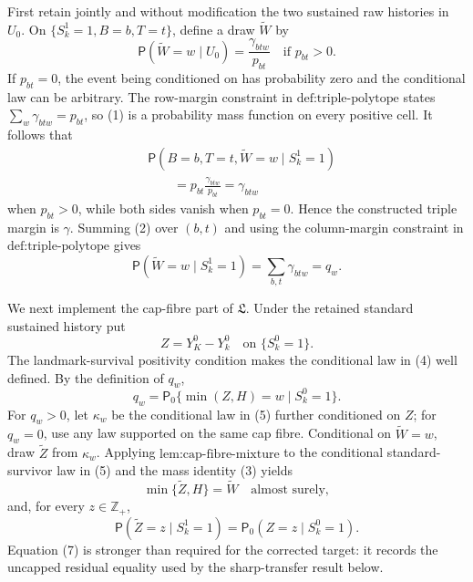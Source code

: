 First retain jointly and without modification the two sustained raw histories in \(U_0\). On \(\{S_k^1=1,B=b,T=t\}\), define a draw \(\widetilde W\) by
\[
 \mathsf P(\widetilde W=w\mid U_0)
 =\frac{\gamma_{btw}}{p_{bt}}\quad\text{if }p_{bt}>0.     \tag{1}
\]
If \(p_{bt}=0\), the event being conditioned on has probability zero and the conditional law can be arbitrary. The row-margin constraint in \(\text{def:triple-polytope}\) states \(\sum_w\gamma_{btw}=p_{bt}\), so (1) is a probability mass function on every positive cell. It follows that
\[
 \begin{aligned}
 &\mathsf P(B=b,T=t,\widetilde W=w\mid S_k^1=1)\\
 &\qquad=p_{bt}\frac{\gamma_{btw}}{p_{bt}}=\gamma_{btw}
 \end{aligned}                                           \tag{2}
\]
when \(p_{bt}>0\), while both sides vanish when \(p_{bt}=0\). Hence the constructed triple margin is \(\gamma\). Summing (2) over \((b,t)\) and using the column-margin constraint in \(\text{def:triple-polytope}\) gives
\[
 \mathsf P(\widetilde W=w\mid S_k^1=1)
 =\sum_{b,t}\gamma_{btw}=q_w.                            \tag{3}
\]

We next implement the cap-fibre part of \(\mathfrak L\). Under the retained standard sustained history put
\[
 Z=Y_K^0-Y_k^0\quad\text{on }\{S_k^0=1\}.               \tag{4}
\]
The landmark-survival positivity condition makes the conditional law in (4) well defined. By the definition of \(q_w\),
\[
 q_w=\mathsf P_0\{\min(Z,H)=w\mid S_k^0=1\}.             \tag{5}
\]
For \(q_w>0\), let \(\kappa_w\) be the conditional law in (5) further conditioned on \(Z\); for \(q_w=0\), use any law supported on the same cap fibre. Conditional on \(\widetilde W=w\), draw \(\widetilde Z\) from \(\kappa_w\). Applying \(\text{lem:cap-fibre-mixture}\) to the conditional standard-survivor law in (5) and the mass identity (3) yields
\[
 \min\{\widetilde Z,H\}=\widetilde W\quad\text{almost surely}, \tag{6}
\]
and, for every \(z\in\mathbb Z_+\),
\[
 \mathsf P(\widetilde Z=z\mid S_k^1=1)
 =\mathsf P_0(Z=z\mid S_k^0=1).                          \tag{7}
\]
Equation (7) is stronger than required for the corrected target: it records the uncapped residual equality used by the sharp-transfer result below.


